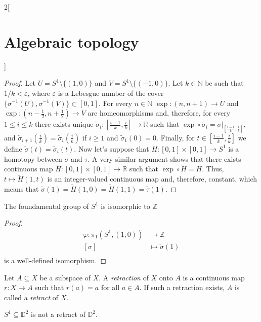 \documentclass[../../../main.tex]{subfiles}
\begin{document}
\begin{multicols}{2}[\section{Algebraic topology}]
	\begin{proof}
		Let $U=S^1\setminus\{(1,0)\}$ and $V=S^1\setminus\{(-1,0)\}$. Let $k\in \mathbb{N}$ be such that $1/k<\varepsilon$, where $\varepsilon$ is a Lebesgue number of the cover $\{\sigma^{-1}(U), \sigma^{-1}(V)\}\subset [0,1]$. For every $n\in \mathbb{N}$ $\operatorname{exp}: (n,n+1)\to U$ and $\operatorname{exp}: (n-\frac{1}{2},n+\frac{1}{2})\to V$ are homeomorphisms and, therefore, for every $1\leq i \leq k$ there exists unique $\tilde{\sigma}_i: [\frac{i-1}{k}, \frac{i}{k}]\to \mathbb{R}$ such that $\operatorname{exp}\circ\tilde{\sigma_i}=\sigma|_{[\frac{i-1}{k}, \frac{i}{k}]}$, and $\tilde{\sigma}_{i+1}(\frac{i}{k})=\tilde{\sigma}_i(\frac{i}{k})$ if $i\geq 1$ and $\tilde{\sigma}_{1}(0)=0$. Finally, for $t\in[\frac{i-1}{k}, \frac{i}{k}]$ we define $\tilde{\sigma}(t)=\tilde{\sigma}_i(t)$. Now let's suppose that $H:[0,1]\times[0,1]\to S^1$ is a homotopy between $\sigma$ and $\tau$. A very similar argument shows that there exists continuous map $\tilde{H}:[0,1]\times[0,1]\to \mathbb{R}$ such that $\operatorname{exp}\circ \tilde{H}=H$. Thus, $t\mapsto \tilde{H}(1,t)$ is an integer-valued continuous map and, therefore, constant, which means that $\tilde{\sigma}(1)=\tilde{H}(1,0)=\tilde{H}(1,1)=\tilde{\tau}(1)$.
	\end{proof}
	
	\begin{theorem}
		The foundamental group of $S^1$ is isomorphic to $\mathbb{Z}$
	\end{theorem}
	
	\begin{proof}
		\begin{align*}
			\varphi: \pi_1(S^1, (1,0)) &\longrightarrow \mathbb{Z} \\
			[\sigma]&\longmapsto \tilde{\sigma}(1) \\
		\end{align*}
		is a well-defined isomorphism.
	\end{proof}
	
	\begin{definition}
		Let $A\subseteq X$ be a subspace of $X$. A \emph{retraction} of $X$ onto $A$ is a continuous map $r: X \to A$ such that $r(a)=a$ for all $a\in A$. If such a retraction exists, $A$ is called a \emph{retract} of $X$. 
	\end{definition}

	\begin{corollary}
		$S^1\subseteq \mathbb{D}^2$ is not a retract of $\mathbb{D}^2$.
	\end{corollary}


\end{multicols}
\end{document}
